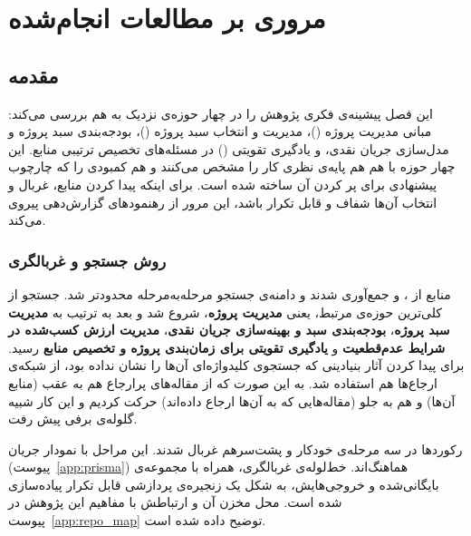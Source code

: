 \chapter{مروری بر مطالعات انجام‌شده}
\label{chap:literature}

\section{مقدمه}
\label{subsec:lr_overview}

این فصل پیشینه‌ی فکری پژوهش را در چهار حوزه‌ی نزدیک به هم بررسی
می‌کند: مبانی مدیریت پروژه ()، مدیریت و انتخاب سبد پروژه
()، بودجه‌بندی سبد پروژه و مدل‌سازی جریان نقدی، و یادگیری
تقویتی () در مسئله‌های تخصیص ترتیبی منابع.
این چهار حوزه با هم هم پایه‌ی نظری کار را مشخص می‌کنند و هم
کمبودی را که چارچوب پیشنهادی برای پر کردن آن ساخته شده است.
برای اینکه پیدا کردن منابع، غربال و انتخاب آن‌ها شفاف و قابل تکرار
باشد، این مرور از رهنمودهای گزارش‌دهی 
\citep{Page2021} پیروی می‌کند.

\subsection{روش جستجو و غربالگری}
\label{subsubsec:prisma}

منابع از ،  و 
جمع‌آوری شدند و دامنه‌ی جستجو مرحله‌به‌مرحله محدودتر شد.
جستجو از کلی‌ترین حوزه‌ی مرتبط، یعنی \textbf{مدیریت پروژه}، شروع شد و
بعد به ترتیب به \textbf{مدیریت سبد پروژه}، \textbf{بودجه‌بندی سبد و
بهینه‌سازی جریان نقدی}، \textbf{مدیریت ارزش کسب‌شده در شرایط
عدم‌قطعیت} و \textbf{یادگیری تقویتی برای زمان‌بندی پروژه و تخصیص منابع}
رسید.
برای پیدا کردن آثار بنیادینی که جستجوی کلیدواژه‌ای آن‌ها را نشان
نداده بود، از شبکه‌ی ارجاع‌ها هم استفاده شد. به این صورت که از
مقاله‌های پرارجاع هم به عقب (منابع آن‌ها) و هم به جلو (مقاله‌هایی که
به آن‌ها ارجاع داده‌اند) حرکت کردیم و این کار شبیه گلوله‌ی برفی
پیش رفت.

رکوردها در سه مرحله‌ی خودکار و پشت‌سرهم غربال شدند. این مراحل با
نمودار جریان  (پیوست~\ref{app:prisma}) هماهنگ‌اند.
خط‌لوله‌ی غربالگری، همراه با مجموعه‌ی بایگانی‌شده و خروجی‌هایش، به
شکل یک زنجیره‌ی پردازشی قابل تکرار پیاده‌سازی شده است. محل مخزن
آن و ارتباطش با مفاهیم این پژوهش در پیوست~\ref{app:repo_map}
توضیح داده شده است.

